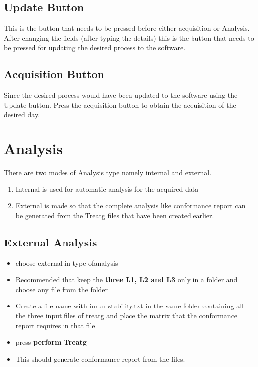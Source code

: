 \documentclass[12pt]{article}
\begin{document}
    \subsection{Update Button}
    This is the button that needs to be pressed before either acquisition or Analysis. After changing the fields (after typing the details) this is the button that needs to be pressed for updating the desired process to the software.
    
    
    
    \subsection{Acquisition Button}
    Since the desired process would have been updated to the software using the Update button. Press the acquisition button to obtain  the acquisition of the desired day. 
   
    
    
     \section{Analysis}
    There are two modes of Analysis type namely internal and external.
    \begin{enumerate}
        \item Internal is used for automatic analysis for the acquired data
        \item External is made so that the complete analysis like conformance report can be generated from the Treatg files that have been created earlier.
    \end{enumerate}
    \subsection{External Analysis}
    
    \begin{itemize}
        \item choose external in type ofanalysis
        \item  Recommended that keep the \textbf{three L1, L2  and L3} only in a folder and choose any file from the folder
        \item   Create a file name with inrun \textunderscore stability.txt in the same folder containing all the three input files of treatg and place the matrix that the conformance report requires in that file
        \item  press \textbf{perform Treatg}
        \item This should generate conformance report from the files.
    \end{itemize}
   
\end{document}
